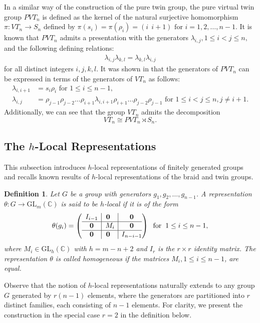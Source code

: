 \documentclass[preprint]{elsarticle}
\newtheorem{definition}[theorem]{Definition}
\begin{document}
In a similar way of the construction of the pure twin group, the pure virtual twin group $PVT_n$ is defined as the kernel of the natural surjective homomorphism $ \pi: VT_n \longrightarrow S_n$ defined by $ \pi(s_i) =\pi(\rho_i) = (i\ \ i+1) \text{ for } i=1,2,\dots, n-1.$ It is known that $PVT_n$ admits a presentation with the generators $\lambda _{i,j}, 1\leq i < j \leq n,$ and the following defining relations: 
\begin{align}
     \lambda_{i,j} \lambda _{k,l} = \lambda_{k,l} \lambda_{i,j}
\end{align}
for all distinct integers $i, j, k,l$.
It was shown in \cite{TNM} that the generators of $PVT_n$ can be expressed in terms of the generators of $VT_n$ as follows:
\begin{align}
\lambda_{i,i+1} & = s_i\rho_i \text{  for  } 1\leq i\leq n-1,\\
\lambda _{i,j} &= \rho_{j-1}\rho_{j-2} \dots \rho_{i+1}\lambda_{i,i+1} \rho_{i+1} \dots \rho_{j-2} \rho_{j-1} \text{ for } 1\leq i<j\leq n, j\neq i+1.
\end{align}
Additionally, we can see that the group $VT_n$ admits the decomposition 
\[
VT_n \cong PVT_n \rtimes S_n.
\]

\subsection{The $h$-Local Representations}
\noindent This subsection introduces \(h\)-local representations of finitely generated groups and recalls known results of $h$-local representations of the braid and twin groups.

\begin{definition} \cite{Nas1}
Let $G$ be a group with generators $g_1,g_2,\ldots,g_{n-1}$. A representation $\theta: G \longrightarrow \mathrm{GL}_{m}(\mathbb{C})$ is said to be $h$-local if it is of the form
$$\theta(g_i) =\left( \begin{array}{c|@{}c|c@{}}
   \begin{matrix}
     I_{i-1} 
   \end{matrix} 
      & \textbf{0} & \textbf{0} \\
      \hline
    \textbf{0} &\hspace{0.2cm} \begin{matrix}
   		M_i
   		\end{matrix}  & \textbf{0}  \\
\hline
\textbf{0} & \textbf{0} & I_{n-i-1}
\end{array} \right) \hspace*{0.2cm} \text{for} \hspace*{0.2cm} 1\leq i\leq n-1,$$ 
where $M_i \in \mathrm{GL}_h(\mathbb{C})$ with $h=m-n+2$ and $I_r$ is the $r\times r$ identity matrix. The representation $\theta$ is called homogeneous if the matrices \(M_i, 1 \leq i \leq n-1\), are equal.
\end{definition}
Observe that the notion of $h$-local representations naturally extends to any group $G$ generated by $r(n-1)$ elements, where the generators are partitioned into $r$ distinct families, each consisting of $n-1$ elements. For clarity, we present the construction in the special case $r = 2$ in the definition below.
\end{document}
